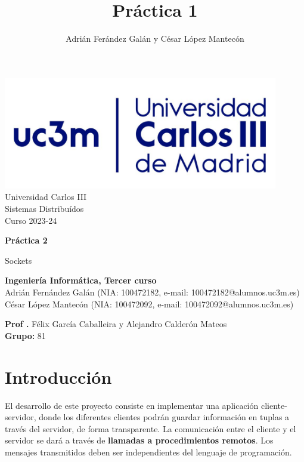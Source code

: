\documentclass[]{article}
\title{Práctica 1}
\author{Adrián Ferández Galán y César López Mantecón}
\begin{document}
\begin{titlepage}
    \centering
   \includegraphics[width=0.9\textwidth]{uc3m.jpg} 
    {\Huge Universidad Carlos III\\
    
     \Large Sistemas Distribuídos\\
     \vspace{0.5cm}
     Curso 2023-24}
    \vspace{2cm}

    {\Huge \textbf{Práctica 2} \par}
    \vspace{0.5cm}
    {\Large Sockets \par}
    \vspace{8cm}

   \textbf{Ingeniería Informática, Tercer curso}\\
    \vspace{0.2cm} 
    Adrián Fernández Galán (NIA: 100472182, e-mail: 100472182@alumnos.uc3m.es) \\
    César López Mantecón   (NIA: 100472092, e-mail: 100472092@alumnos.uc3m.es)
    \vspace{0.5cm}

   
    \textbf{Prof .} Félix García Caballeira y Alejandro Calderón Mateos\\
    
    \textbf{Grupo: } 81   
    
\end{titlepage}
\newpage

\renewcommand{\contentsname}{\centering Índice}
\tableofcontents

\newpage

\section{Introducción}
\label{sec:introduccion}
El desarrollo de este proyecto consiste en implementar una aplicación cliente-servidor, donde los diferentes clientes podrán guardar información en tuplas a través del servidor, de forma transparente. La comunicación entre el cliente y el servidor se dará a través de \textbf{llamadas a procedimientos remotos}. Los mensajes transmitidos deben ser independientes del lenguaje de programación. 
\end{document}

